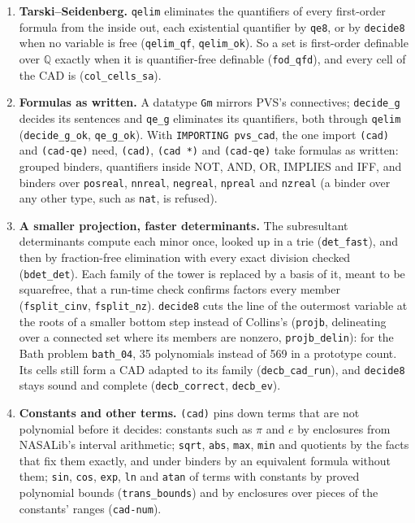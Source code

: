 \documentclass[11pt]{article}
\begin{document}
\begin{enumerate}[leftmargin=1.3em, itemsep=2pt, topsep=2pt]
(\texttt{col\_found\_cad}). \texttt{decide8} decides on that tower (with the line cut at the roots of a smaller bottom
step, item 8), and \texttt{qe8} eliminates quantifiers on it or on one whose free levels are closed under the
derivative (\texttt{decide8\_decides}, \texttt{qe8\_complete}).
\item \textbf{Tarski--Seidenberg.} \texttt{qelim} eliminates the quantifiers of every first-order formula from the inside
out, each existential quantifier by \texttt{qe8}, or by \texttt{decide8} when no variable is free (\texttt{qelim\_qf},
\texttt{qelim\_ok}). So a set is first-order definable over $\mathbb{Q}$ exactly when it is quantifier-free definable
(\texttt{fod\_qfd}), and every cell of the CAD is (\texttt{col\_cells\_sa}).
\item \textbf{Formulas as written.} A datatype \texttt{Gm} mirrors PVS's connectives; \texttt{decide\_g} decides its
sentences and \texttt{qe\_g} eliminates its quantifiers, both through \texttt{qelim} (\texttt{decide\_g\_ok},
\texttt{qe\_g\_ok}). With \texttt{IMPORTING pvs\_cad}, the one import \texttt{(cad)} and \texttt{(cad-qe)} need, \texttt{(cad)}, \texttt{(cad *)}
and \texttt{(cad-qe)} take formulas as written: grouped binders, quantifiers inside NOT, AND, OR, IMPLIES and IFF, and
binders over \texttt{posreal}, \texttt{nnreal}, \texttt{negreal}, \texttt{npreal} and \texttt{nzreal} (a binder over any
other type, such as \texttt{nat}, is refused).
\item \textbf{A smaller projection, faster determinants.} The subresultant determinants compute each minor once, looked
up in a trie (\texttt{det\_fast}), and then by fraction-free elimination with every exact division checked
(\texttt{bdet\_det}). Each family of the tower is replaced by a basis of it, meant to be squarefree, that a run-time
check confirms factors every member (\texttt{fsplit\_cinv}, \texttt{fsplit\_nz}). \texttt{decide8} cuts the line of the
outermost variable at the roots of a smaller bottom step instead of Collins's (\texttt{projb}, delineating over a
connected set where its members are nonzero, \texttt{projb\_delin}): for the Bath problem \texttt{bath\_04}, 35
polynomials instead of 569 in a prototype count. Its cells still form a CAD adapted to its family
(\texttt{decb\_cad\_run}), and \texttt{decide8} stays sound and complete (\texttt{decb\_correct},
\texttt{decb\_ev}).
\item \textbf{Constants and other terms.} \texttt{(cad)} pins down terms that are not polynomial before it decides:
constants such as $\pi$ and $e$ by enclosures from NASALib's interval arithmetic; \texttt{sqrt}, \texttt{abs},
\texttt{max}, \texttt{min} and quotients by the facts that fix them exactly, and under binders by an equivalent formula
without them; \texttt{sin}, \texttt{cos}, \texttt{exp}, \texttt{ln} and \texttt{atan} of terms with constants by proved
polynomial bounds (\texttt{trans\_bounds}) and by enclosures over pieces of the constants' ranges (\texttt{cad-num}).
\end{enumerate}
\end{document}
